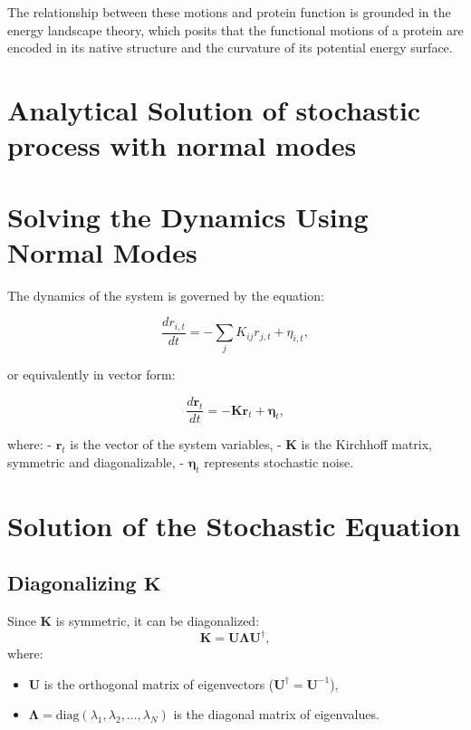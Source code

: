 \documentclass[English, Lau, oneside]{sapthesis}
\begin{document}
The relationship between these motions and protein function is grounded in the energy landscape theory, which posits that the functional motions of a protein are encoded in its native structure and the curvature of its potential energy surface.
\newpage
\section{Analytical Solution of stochastic process with normal modes}
\section{Solving the Dynamics Using Normal Modes}

The dynamics of the system is governed by the equation:

\begin{equation}
\frac{d r_{i,t}}{dt} = -\sum_j K_{ij} r_{j,t} + \eta_{i,t},
\end{equation}

or equivalently in vector form:

\begin{equation}
\frac{d \mathbf{r}_t}{dt} = -\mathbf{K} \mathbf{r}_t + \boldsymbol{\eta}_t,
\end{equation}

where:
- \( \mathbf{r}_t \) is the vector of the system variables,
- \( \mathbf{K} \) is the Kirchhoff matrix, symmetric and diagonalizable,
- \( \boldsymbol{\eta}_t \) represents stochastic noise.
\section{Solution of the Stochastic Equation}

\subsection{Diagonalizing \(\mathbf{K}\)}

Since \(\mathbf{K}\) is symmetric, it can be diagonalized:
\[
\mathbf{K} = \mathbf{U} \boldsymbol{\Lambda} \mathbf{U}^\dagger,
\]
where:
\begin{itemize}
    \item \(\mathbf{U}\) is the orthogonal matrix of eigenvectors (\(\mathbf{U}^\dagger = \mathbf{U}^{-1}\)),
    \item \(\boldsymbol{\Lambda} = \text{diag}(\lambda_1, \lambda_2, \dots, \lambda_N)\) is the diagonal matrix of eigenvalues.
\end{itemize}
\end{document}
